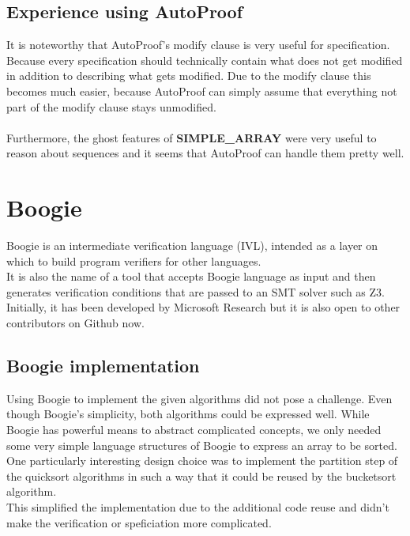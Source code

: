 \documentclass{report}
\begin{document}
\subsection{Experience using AutoProof}

It is noteworthy that AutoProof's modify clause is very useful for specification.
Because every specification should technically contain what does not get modified
in addition to describing what gets modified. Due to the modify clause this
becomes much easier, because AutoProof can simply assume that everything not part
of the modify clause stays unmodified.
\\
\\
Furthermore, the ghost features of \textbf{SIMPLE\_ARRAY} were very useful to
reason about sequences and it seems that AutoProof can handle them pretty well.

\section{Boogie}
\label{s:boogie}
Boogie is an intermediate verification language (IVL), intended as a layer on which to build program verifiers for other languages\cite{boogiegithub}.\\
It is also the name of a tool that accepts Boogie language as input and then generates verification conditions that are passed to an SMT solver such as Z3\cite{de2008z3}\cite{z3}.\\
Initially, it has been developed by Microsoft Research but it is also open to other contributors on Github now.

\subsection{Boogie implementation}

Using Boogie to implement the given algorithms did not pose a challenge.
Even though Boogie's simplicity, both algorithms could be expressed well.
While Boogie has powerful means to abstract complicated concepts, we only
needed some very simple language structures of Boogie to express an array to be sorted.\\
One particularly interesting design choice was to implement the partition step
of the quicksort algorithms in such a way that it could be reused by the bucketsort algorithm.\\
This simplified the implementation due to the additional code reuse and didn't
make the verification or speficiation more complicated.
\end{document}
